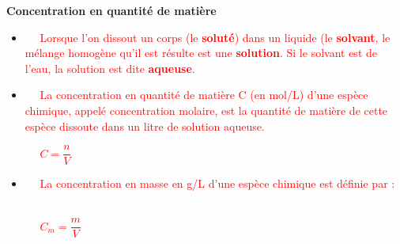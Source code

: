 \documentclass[11pt,a4paper]{article}
\newcommand{\ctext}[1]
{\begin{bclogo}[couleur = white,logo= , arrondi = 0.1,barre=none]
{}
\vspace{-8mm}
~~
\textcolor{red}{#1}
~~
\end{bclogo}}
\begin{document}
\begin{fleche}
\item \textbf{Concentration en quantité de matière}
\vspace{-5mm}
\begin{itemize}
    \item 
    \begin{minipage}{.9\textwidth}%
    \ctext{Lorsque l'on dissout un corps (le \textbf{soluté}) dans un liquide (le \textbf{solvant}, le mélange homogène qu'il est résulte est une \textbf{solution}. Si le solvant est de l'eau, la solution est dite \textbf{aqueuse}. }

    \end{minipage}

    \item 
    \noindent
    \begin{minipage}{.72\textwidth}%
    \ctext{
    La concentration en quantité de matière C (en mol/L) d'une espèce chimique, appelé concentration molaire, est la quantité de matière de cette espèce dissoute dans un litre de solution aqueuse. 
    }
    \end{minipage}
    \hfill
\begin{minipage}{.15\textwidth}%
\ctext{$C=\dfrac{n}{V}$}
\end{minipage}%
    \vspace{-2mm}
        \item 
    \noindent
    \begin{minipage}{.72\textwidth}%
    \ctext{
    La concentration en masse  en g/L d'une espèce chimique est définie par : 
    }
    \end{minipage}
    \hfill
\begin{minipage}{.15\textwidth}%
\ctext{$C_m=\dfrac{m}{V}$}
\end{minipage}%

\end{itemize}

\end{fleche}
\end{document}
